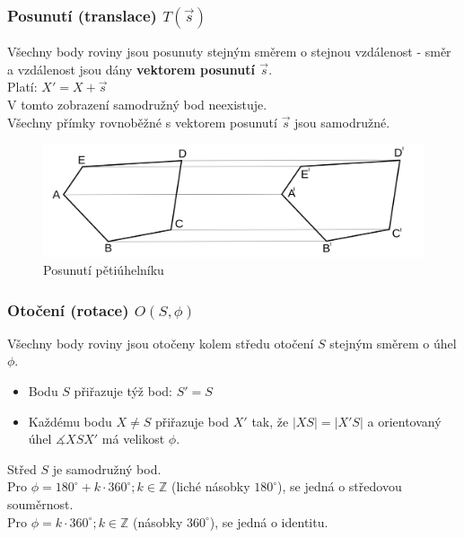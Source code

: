         \subsubsection{Posunutí (translace) $T(\vec s)$}
            Všechny body roviny jsou posunuty stejným směrem o stejnou vzdálenost - směr a vzdálenost jsou dány \textbf{vektorem posunutí $\vec s$}.\\
            Platí: $X'=X+\vec s$\\
            V tomto zobrazení samodružný bod neexistuje.\\
            Všechny přímky rovnoběžné s vektorem posunutí $\vec s$ jsou samodružné.

            \begin{figure}[H]
                \centering
                \includegraphics[width=0.5\linewidth]{img/19_posunuti.png}
                \caption{Posunutí pětiúhelníku} 
                \label{fig:enter-label}
            \end{figure}
            
        \subsubsection{Otočení (rotace) $O(S, \phi)$}
            Všechny body roviny jsou otočeny kolem středu otočení $S$ stejným směrem o úhel $\phi$.\\
            \begin{itemize}
                \item Bodu $S$ přiřazuje týž bod: $S'=S$ \\
                \item Každému bodu $X \neq S$ přiřazuje bod $X'$ tak, že $\left| XS \right| = \left| X'S \right|$ a orientovaný úhel $\measuredangle XSX'$ má velikost $\phi$.\\
            \end{itemize}
            Střed $S$ je samodružný bod.\\
            Pro $\phi = 180^{\circ}+k \cdot 360^{\circ};k \in \mathbb{Z} $ (liché násobky $180^{\circ}$), se jedná o středovou souměrnost.\\
            Pro $\phi = k \cdot 360^{\circ};k \in \mathbb{Z} $ (násobky $360^{\circ}$), se jedná o identitu.

